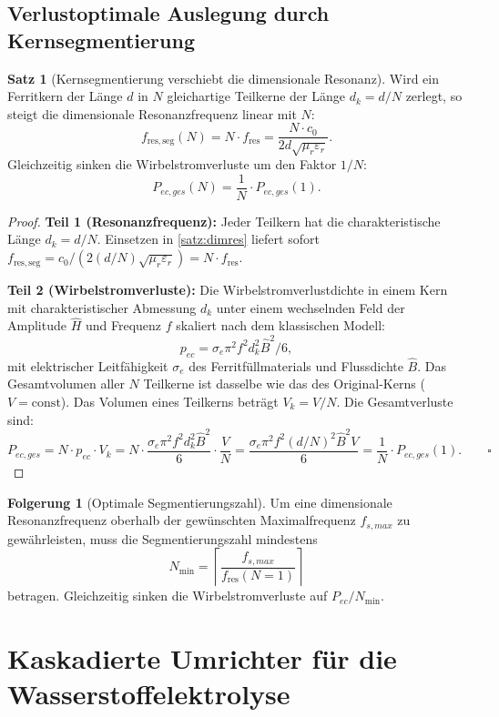 ﻿\documentclass[a4paper,12pt,openany,oneside]{book}
\newcommand{\abschnitt}[1]{\section{#1}}
\theoremstyle{definition}
\newtheorem{satz}{Satz}[chapter]
\newtheorem{korollar}{Folgerung}[chapter]
\begin{document}
\abschnitt{Verlustoptimale Auslegung durch Kernsegmentierung}

\begin{satz}[Kernsegmentierung verschiebt die dimensionale Resonanz]
\label{satz:segmentierung}
  Wird ein Ferritkern der L\"ange $d$ in $N$ gleichartige Teilkerne der L\"ange $d_k = d/N$
  zerlegt, so steigt die dimensionale Resonanzfrequenz linear mit $N$:
  \[
    f_\mathrm{res,seg}(N) = N \cdot f_\mathrm{res} = \frac{N \cdot c_0}{2d\sqrt{\mu_r\varepsilon_r}}.
  \]
  Gleichzeitig sinken die Wirbelstromverluste um den Faktor $1/N$:
  \[
    P_{ec,ges}(N) = \frac{1}{N} \cdot P_{ec,ges}(1).
  \]
\end{satz}

\begin{proof}
  \textbf{Teil 1 (Resonanzfrequenz):} Jeder Teilkern hat die charakteristische L\"ange
  $d_k = d/N$. Einsetzen in \autoref{satz:dimres} liefert sofort
  $f_\mathrm{res,seg} = c_0 / (2(d/N)\sqrt{\mu_r\varepsilon_r}) = N \cdot f_\mathrm{res}$.

  \textbf{Teil 2 (Wirbelstromverluste):} Die Wirbelstromverlustdichte in einem Kern
  mit charakteristischer Abmessung $d_k$ unter einem wechselnden Feld der Amplitude
  $\hat{H}$ und Frequenz $f$ skaliert nach dem klassischen Modell:
  \[
    p_{ec} = \sigma_e \pi^2 f^2 d_k^2 \hat{B}^2 / 6,
  \]
  mit elektrischer Leitf\"ahigkeit $\sigma_e$ des Ferritf\"ullmaterials und Flussdichte $\hat{B}$.
  Das Gesamtvolumen aller $N$ Teilkerne ist dasselbe wie das des Original-Kerns ($V = \mathrm{const}$).
  Das Volumen eines Teilkerns betr\"agt $V_k = V/N$. Die Gesamtverluste sind:
  \[
    P_{ec,ges} = N \cdot p_{ec} \cdot V_k
    = N \cdot \frac{\sigma_e \pi^2 f^2 d_k^2 \hat{B}^2}{6} \cdot \frac{V}{N}
    = \frac{\sigma_e \pi^2 f^2 (d/N)^2 \hat{B}^2 V}{6}
    = \frac{1}{N} \cdot P_{ec,ges}(1).  \qquad\square
  \]
\end{proof}

\begin{korollar}[Optimale Segmentierungszahl]
  Um eine dimensionale Resonanzfrequenz oberhalb der gew\"unschten Maximalfrequenz
  $f_{s,max}$ zu gew\"ahrleisten, muss die Segmentierungszahl mindestens
  \[
    N_\mathrm{min} = \left\lceil \frac{f_{s,max}}{f_\mathrm{res}(N{=}1)} \right\rceil
  \]
  betragen. Gleichzeitig sinken die Wirbelstromverluste auf $P_{ec}/N_\mathrm{min}$.
\end{korollar}

\chapter{Kaskadierte Umrichter f\"ur die Wasserstoffelektrolyse}
\label{kap:h2}
\end{document}

